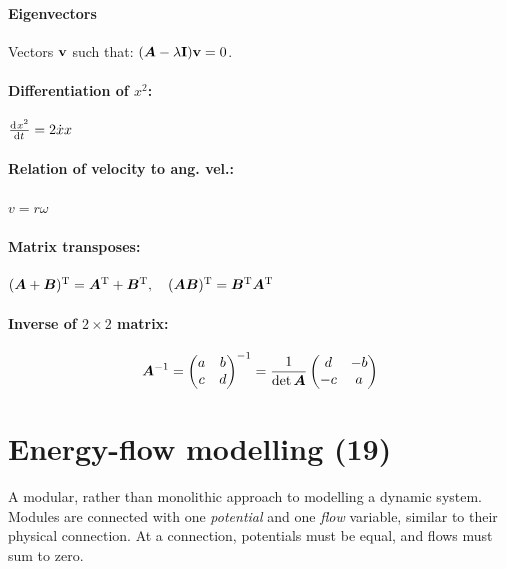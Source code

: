 \documentclass[a4paper, 12pt]{article}
\begin{document}
\paragraph{Eigenvectors} Vectors \( \mathbf{v} \) such that: \( (\bm{A} - \lambda \mathbf{I})\mathbf{v} = 0 \).
\paragraph{Differentiation of \(x^2\):} \(\od{x^2}{t} = 2 \dot{x} x\)
\paragraph{Relation of velocity to ang. vel.:} \(v = r \omega\)
\paragraph{Matrix transposes:} \( (\bm{A} + \bm{B})^{\text{T}} = \bm{A}^{\text{T}} + \bm{B}^{\text{T}}, \quad (\bm{AB})^{\text{T}} = \bm{B}^{\text{T}} \bm{A}^{\text{T}} \)
\paragraph{Inverse of \(2 \times 2\) matrix:}
\[
\bm{A}^{-1} = 
\begin{pmatrix} a & b \\ c & d \end{pmatrix}^{-1} =
\frac{1}{\det \bm{A}} \begin{pmatrix} d & -b \\ -c & a \end{pmatrix}
\] 

\section{Energy-flow modelling (19)}
A modular, rather than monolithic approach to modelling a dynamic system. Modules are connected with one \emph{potential} and one \emph{flow} variable, similar to their physical connection. At a connection, potentials must be equal, and flows must sum to zero.
\end{document}
